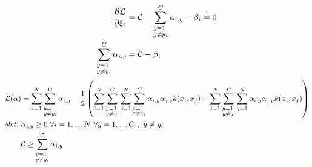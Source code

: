 \begin{align}
	\frac{\partial \mathcal{L}}{\partial \xi_i} &= \mathcal{C} - \sum_{\begin{subarray}{l} y=1 \\ y\neq y_i \end{subarray}}^C \alpha_{i,y} - \beta_i \stackrel{!}{=} 0 \\
	\sum_{\begin{subarray}{l} y=1 \\ y\neq y_i \end{subarray}}^C \alpha_{i,y} &= \mathcal{C} -\beta_i
\end{align}
\begin{align}
	\mathcal{L}(\alpha) &= \sum_{i=1}^N \sum_{\begin{subarray}{l} y=1 \\ y\neq y_i \end{subarray}}^C \alpha_{i,y} -\frac{1}{2}\left( \sum_{i=1}^N \sum_{\begin{subarray}{l} y=1 \\ y\neq y_i \end{subarray}}^C 
		\sum_{j=1}^N \sum_{\begin{subarray}{l} z=1 \\ z\neq z_j \end{subarray}}^C 
	   \alpha_{i,y} \alpha_{j,z} k(x_i,x_j)
	 +\sum_{i=1}^N \sum_{\begin{subarray}{l} y=1 \\ y\neq y_i \end{subarray}}^C 
	\sum_{j=1}^N 
	   \alpha_{i,y} \alpha_{j,y} k(x_i,x_j) 
	  \right)\\
   sb.t. ~ &\alpha_{i,y} \geq 0 ~ \forall i = 1,...,N ~ \forall y = 1,...,C ~ ,~ y\neq y_i\notag \\
	&\mathcal{C} \geq \sum_{\begin{subarray}{l} y=1 \\ y\neq y_i \end{subarray}}^C \alpha_{i,y} \notag
\end{align}


